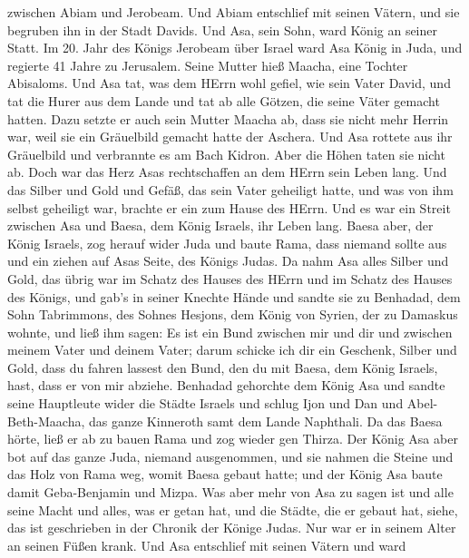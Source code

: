 zwischen Abiam und Jerobeam.  Und Abiam entschlief mit
seinen Vätern, und sie begruben ihn in der Stadt Davids. Und Asa, sein
Sohn, ward König an seiner Statt.  Im 20. Jahr des Königs
Jerobeam über Israel ward Asa König in Juda,  und regierte
41 Jahre zu Jerusalem. Seine Mutter hieß Maacha, eine Tochter Abisaloms.
 Und Asa tat, was dem HErrn wohl gefiel, wie sein Vater
David,  und tat die Hurer aus dem Lande und tat ab alle
Götzen, die seine Väter gemacht hatten.  Dazu setzte er
auch sein Mutter Maacha ab, dass sie nicht mehr Herrin war, weil sie ein
Gräuelbild gemacht hatte der Aschera. Und Asa rottete aus ihr Gräuelbild
und verbrannte es am Bach Kidron.  Aber die Höhen taten sie
nicht ab. Doch war das Herz Asas rechtschaffen an dem HErrn sein Leben
lang.  Und das Silber und Gold und Gefäß, das sein Vater
geheiligt hatte, und was von ihm selbst geheiligt war, brachte er ein
zum Hause des HErrn.  Und es war ein Streit zwischen Asa
und Baesa, dem König Israels, ihr Leben lang.  Baesa aber,
der König Israels, zog herauf wider Juda und baute Rama, dass niemand
sollte aus und ein ziehen auf Asas Seite, des Königs Judas.
 Da nahm Asa alles Silber und Gold, das übrig war im Schatz
des Hauses des HErrn und im Schatz des Hauses des Königs, und gab's in
seiner Knechte Hände und sandte sie zu Benhadad, dem Sohn Tabrimmons,
des Sohnes Hesjons, dem König von Syrien, der zu Damaskus wohnte, und
ließ ihm sagen:  Es ist ein Bund zwischen mir und dir und
zwischen meinem Vater und deinem Vater; darum schicke ich dir ein
Geschenk, Silber und Gold, dass du fahren lassest den Bund, den du mit
Baesa, dem König Israels, hast, dass er von mir abziehe. 
Benhadad gehorchte dem König Asa und sandte seine Hauptleute wider die
Städte Israels und schlug Ijon und Dan und Abel-Beth-Maacha, das ganze
Kinneroth samt dem Lande Naphthali.  Da das Baesa hörte,
ließ er ab zu bauen Rama und zog wieder gen Thirza.  Der
König Asa aber bot auf das ganze Juda, niemand ausgenommen, und sie
nahmen die Steine und das Holz von Rama weg, womit Baesa gebaut hatte;
und der König Asa baute damit Geba-Benjamin und Mizpa.  Was
aber mehr von Asa zu sagen ist und alle seine Macht und alles, was er
getan hat, und die Städte, die er gebaut hat, siehe, das ist geschrieben
in der Chronik der Könige Judas. Nur war er in seinem Alter an seinen
Füßen krank.  Und Asa entschlief mit seinen Vätern und ward
